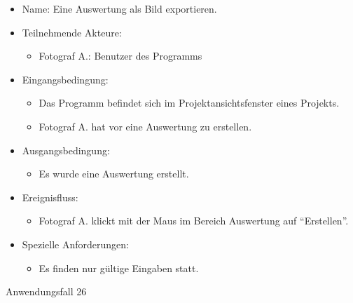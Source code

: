 	\begin{itemize}
		\item Name: Eine Auswertung als Bild exportieren.
		\item Teilnehmende Akteure:
		\begin{itemize}
			\item	Fotograf A.: Benutzer des Programms		
		\end{itemize}
		\item Eingangsbedingung:
		\begin{itemize}
			\item	Das Programm befindet sich im Projektansichtsfenster eines Projekts.
			\item Fotograf A. hat vor eine Auswertung zu erstellen.
		\end{itemize}
		\item Ausgangsbedingung:
		\begin{itemize}
			\item	Es wurde eine Auswertung erstellt.	
		\end{itemize}
		\item Ereignisfluss:
		\begin{itemize}
			\item Fotograf A. klickt mit der Maus im Bereich Auswertung auf "`Erstellen"'.
		\end{itemize}
		\item Spezielle Anforderungen:
		\begin{itemize}
			\item	Es finden nur gültige Eingaben statt.			
		\end{itemize}			
	\end{itemize}
	
	\begin{description}
		\item[Anwendungsfall 26]
	\end{description}
	
